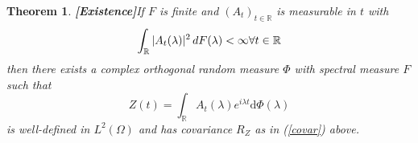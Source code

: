 \documentclass{article}
\newcommand{\mathd}{\mathrm{d}}
\newcommand{\tmstrong}[1]{\textbf{#1}}
\newtheorem{theorem}{Theorem}
\begin{document}
\begin{theorem}
  {\tmstrong{[Existence]}}\label{thm:existence_osc} If $F$ is finite and
  $(A_t)_{t \in \mathbb{R}}$ is measurable in $t$ with
  \begin{equation}
    \int_{\mathbb{R}} |A_t (\lambda) |^2  \hspace{0.17em} dF (\lambda) <
    \infty \forall t \in \mathbb{R}
  \end{equation}
  then there exists a complex orthogonal random measure $\Phi$ with spectral
  measure $F$ such that
  \begin{equation}
    Z (t) = \int_{\mathbb{R}} A_t (\lambda) e^{i \lambda t} \mathd \Phi
    (\lambda)
  \end{equation}
  is well-defined in $L^2 (\Omega)$ and has covariance $R_Z$ as in
  (\ref{covar}) above.
\end{theorem}
\end{document}
